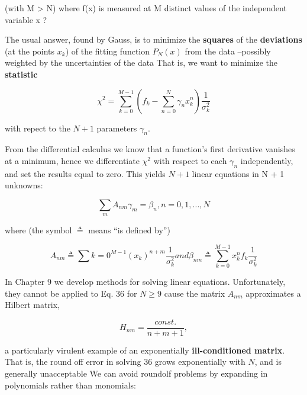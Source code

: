 (with M > N) where f(x) is measured at M distinct values of the independent variable x ?

The usual answer, found by Gauss, is to minimize the \textbf{squares} of the \textbf{deviations} (at the points $x_k$) of the fitting function $P_N(x)$ from the data --possibly weighted by the uncertainties of the data That is, we want to minimize the \textbf{statistic}

\begin{equation}
\chi^2 = \sum_{k=0}^{M-1} \left( f_k - \sum_{n=0}^{N} \gamma_n x_{k}^n \right) \frac{1}{\sigma_{k}^{2}}
\end{equation}

with repect to the $N + 1$ parameters $\gamma_{n}$.

From the differential calculus we know that a function's first derivative vanishes at a minimum, hence we differentiate $\chi^{2}$ with respect to each $\gamma_{n}$ independently, and set the results equal to zero. This yields $N + 1$ linear equations in N + 1 unknowns:

\begin{equation}
\sum_{m} A_{nm} \gamma_{m} = \beta_{n}, n = 0, 1, ... , N
\end{equation}

where (the symbol $\triangleq$ means “is defined by”)

\begin{subequations}
    \begin{equation}
    A_{nm} \triangleq \sum{k=0}^{M-1}(x_{k})^{n+m} \frac{1}{\sigma_{k}^{2}}
    \end{equation}
and
    \begin{equation}
    \beta_{nm} \triangleq \sum_{k=0}^{M-1}x_{k}^{n}f_{k}\frac{1}{\sigma_{k}^{2}}
    \end{equation}
\end{subequations}

In Chapter 9 we develop methods for solving linear equations. Unfortunately, they cannot be applied to Eq. 36 for $N \geq 9$ cause the matrix $A_{nm}$ approximates a Hilbert matrix,

\begin{equation*}
H_{nm} = \frac{const.}{n+m+1} ,
\end{equation*}

a particularly virulent example of an exponentially \textbf{ill-conditioned matrix}. That is, the round off error in solving 36 grows exponentially with $N$, and is generally unacceptable We can avoid roundolf problems by expanding in polynomials rather than monomials:

